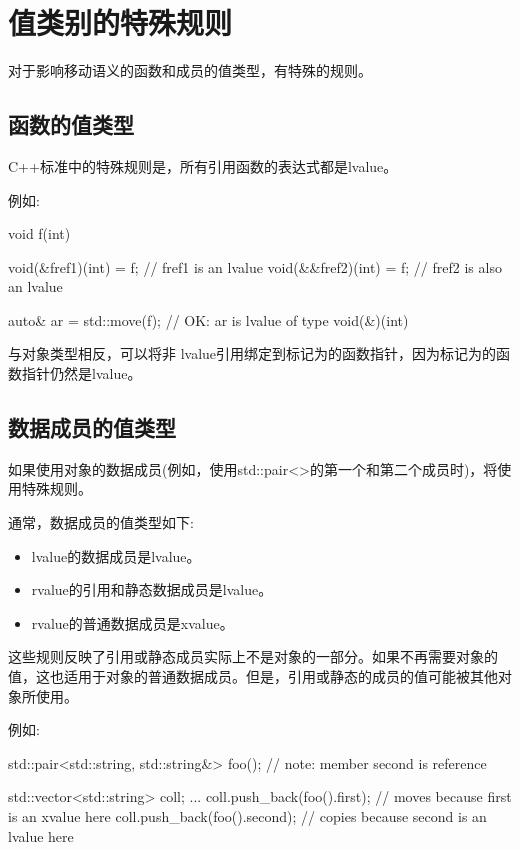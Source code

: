 \section{值类别的特殊规则}
对于影响移动语义的函数和成员的值类型，有特殊的规则。

\subsection{函数的值类型}

C++标准中的特殊规则是，所有引用函数的表达式都是lvalue。

例如:

\begin{cppcode}
void f(int) {
}

void(&fref1)(int) = f; // fref1 is an lvalue
void(&&fref2)(int) = f; // fref2 is also an lvalue

auto& ar = std::move(f); // OK: ar is lvalue of type void(&)(int)
\end{cppcode}

与对象类型相反，可以将非 lvalue引用绑定到标记为的函数指针，因为标记为的函数指针仍然是lvalue。

\subsection{数据成员的值类型}

如果使用对象的数据成员(例如，使用std::pair<>的第一个和第二个成员时)，将使用特殊规则。

通常，数据成员的值类型如下:

\begin{itemize}
	\item lvalue的数据成员是lvalue。
	\item rvalue的引用和静态数据成员是lvalue。
	\item rvalue的普通数据成员是xvalue。
\end{itemize}

这些规则反映了引用或静态成员实际上不是对象的一部分。如果不再需要对象的值，这也适用于对象的普通数据成员。但是，引用或静态的成员的值可能被其他对象所使用。

例如:

\begin{cppcode}
std::pair<std::string, std::string&> foo(); // note: member second is reference

std::vector<std::string> coll;
...
coll.push_back(foo().first); // moves because first is an xvalue here
coll.push_back(foo().second); // copies because second is an lvalue here
\end{cppcode}

